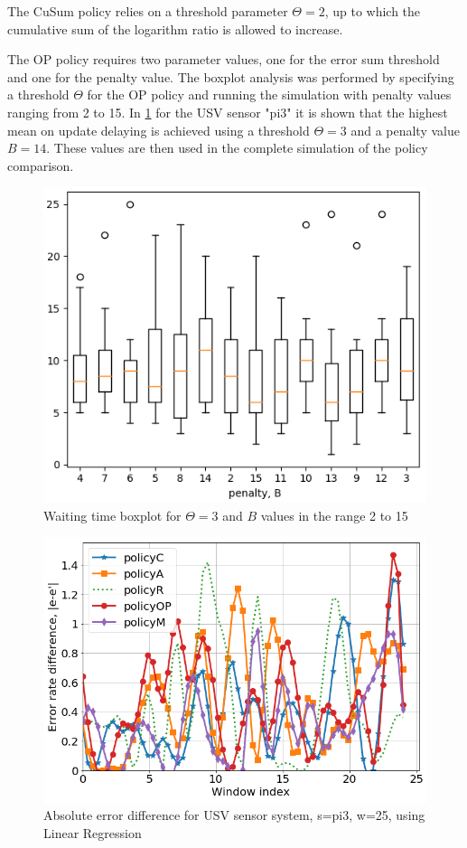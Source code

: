 \documentclass{mpaper}
\begin{document}
The CuSum policy relies on a threshold parameter $\Theta = 2$, up to which the cumulative sum of the logarithm ratio is allowed to increase.

The OP policy requires two parameter values, one for the error sum threshold and one for the penalty value. The boxplot analysis was performed by specifying a threshold $\Theta$ for the OP policy and running the simulation with penalty values ranging from 2 to 15. 
In \ref{fig:boxplot_linreg} for the USV sensor "pi3" it is shown that the highest mean on update delaying is achieved using a threshold $\Theta = 3$ and a penalty value $B=14$.
These values are then used in the complete simulation of the policy comparison.

\begin{figure}[h]
    \centering
    \includegraphics[scale=0.4]{imgs/boxplot_linreg_waiting_pi3.png}
    \caption{Waiting time boxplot for $\Theta=3$ and $B$ values in the range 2 to 15}
    \label{fig:boxplot_linreg}
\end{figure}

\begin{figure}[h]
    \centering
    \includegraphics[scale=0.33]{imgs/lin_reg_pi3_w25.png}
    \caption{Absolute error difference for USV sensor system, s=pi3, w=25, using Linear Regression}
    \label{fig:err_lin_reg_pi3}
\end{figure}
\end{document}
